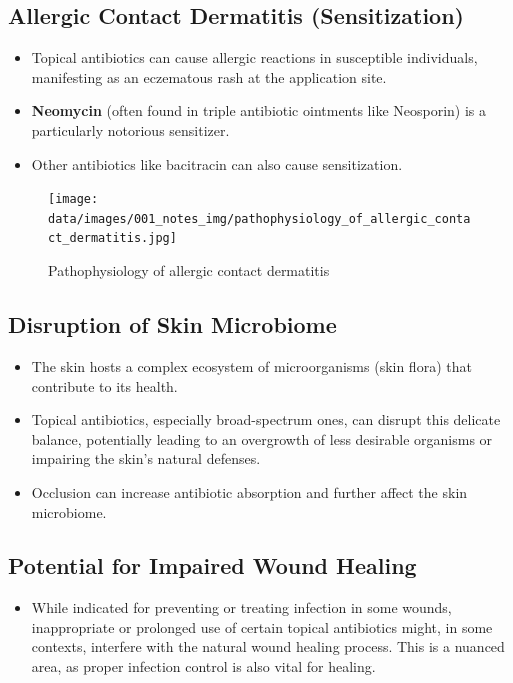 \documentclass{article}
\begin{document}
\subsection*{\textbf{Allergic Contact Dermatitis (Sensitization)}}
\begin{itemize}
    \item Topical antibiotics can cause allergic reactions in susceptible individuals, manifesting as an eczematous rash at the application site.
    \item \textbf{Neomycin} (often found in triple antibiotic ointments like Neosporin) is a particularly notorious sensitizer.
    \item Other antibiotics like bacitracin can also cause sensitization.
\end{itemize}

\begin{figure}[h]
    \centering
    \texttt{[image: data/images/001\_notes\_img/pathophysiology\_of\_allergic\_contact\_dermatitis.jpg]}
    \caption{Pathophysiology of allergic contact dermatitis}
    \label{fig:pathophysiology_of_allergic_contact_dermatitis}
\end{figure}

\subsection*{Disruption of Skin Microbiome}
\begin{itemize}
    \item The skin hosts a complex ecosystem of microorganisms (skin flora) that contribute to its health.
    \item Topical antibiotics, especially broad-spectrum ones, can disrupt this delicate balance, potentially leading to an overgrowth of less desirable organisms or impairing the skin's natural defenses.
    \item Occlusion can increase antibiotic absorption and further affect the skin microbiome.
\end{itemize}

\subsection*{Potential for Impaired Wound Healing}
\begin{itemize}
    \item While indicated for preventing or treating infection in some wounds, inappropriate or prolonged use of certain topical antibiotics might, in some contexts, interfere with the natural wound healing process. This is a nuanced area, as proper infection control is also vital for healing.
\end{itemize}
\end{document}
